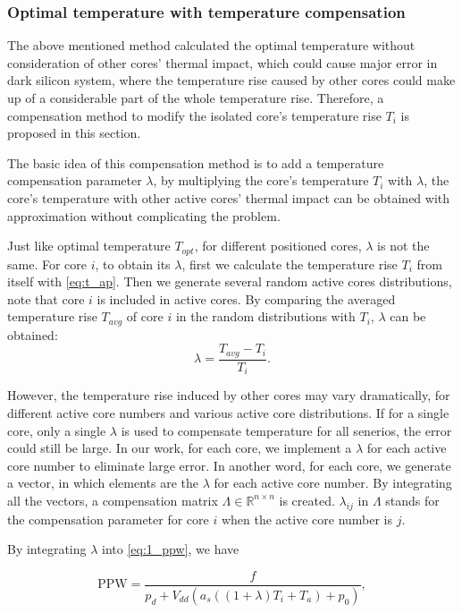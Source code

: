 \subsubsection{Optimal temperature with temperature compensation}
The above mentioned method calculated the optimal temperature without consideration of other cores' thermal impact, which could cause major error in dark silicon system, where the temperature rise caused by other cores could make up of a considerable part of the whole temperature rise. Therefore, a compensation method to modify the isolated core's temperature rise $T_{i}$ is proposed in this section.

The basic idea of this compensation method is to add a temperature compensation parameter $\lambda$, by multiplying the core's temperature $T_{i}$ with $\lambda$, the core's temperature with other active cores' thermal impact can be obtained with approximation without complicating the problem.

Just like optimal temperature $T_{opt}$, for different positioned cores, $\lambda$ is not the same. For core $i$, to obtain its $\lambda$, first we calculate the temperature rise $T_{i}$ from itself with \eqref{eq:t_ap}. Then we generate several random active cores distributions, note that core $i$ is included in active cores. By comparing the averaged temperature rise $T_{avg}$ of core $i$ in the random distributions with $T_{i}$, $\lambda$ can be obtained:
\begin{equation}\label{eq:lambda}
\lambda = \frac{T_{avg}-T_{i}}{T_{i}}.
\end{equation}

However, the temperature rise induced by other cores may vary dramatically, for different active core numbers and various active core distributions. If for a single core, only a single $\lambda$ is used to compensate temperature for all senerios, the error could still be large. In our work, for each core, we implement a $\lambda$ for each active core number to eliminate large error. In another word, for each core, we generate a vector, in which elements are the $\lambda$ for each active core number. By integrating all the vectors, a compensation matrix $\Lambda \in \mathbb{R}^{n \times n}$ is created. $\lambda_{ij}$ in $\Lambda$ stands for the compensation parameter for core $i$ when the active core number is $j$.

By integrating $\lambda$ into \eqref{eq:1_ppw}, we have

\begin{equation}\label{eq:c_full_1_ppw}
\text{PPW}=\frac{f}{p_{d}+V_{dd}(a_{s}((1+\lambda)T_{i}+T_{a})+p_{0})},
\end{equation}

